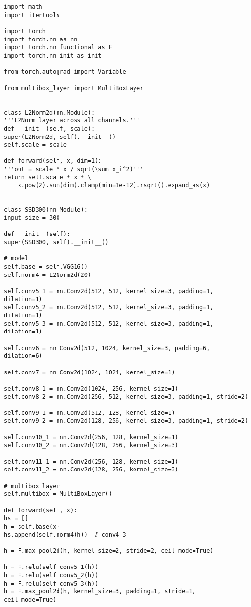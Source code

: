 \begin{lstlisting}[caption={SSD网络模型}]
import math
import itertools

import torch
import torch.nn as nn
import torch.nn.functional as F
import torch.nn.init as init

from torch.autograd import Variable

from multibox_layer import MultiBoxLayer


class L2Norm2d(nn.Module):
'''L2Norm layer across all channels.'''
def __init__(self, scale):
super(L2Norm2d, self).__init__()
self.scale = scale

def forward(self, x, dim=1):
'''out = scale * x / sqrt(\sum x_i^2)'''
return self.scale * x * \
	x.pow(2).sum(dim).clamp(min=1e-12).rsqrt().expand_as(x)


class SSD300(nn.Module):
input_size = 300

def __init__(self):
super(SSD300, self).__init__()

# model
self.base = self.VGG16()
self.norm4 = L2Norm2d(20)

self.conv5_1 = nn.Conv2d(512, 512, kernel_size=3, padding=1, dilation=1)
self.conv5_2 = nn.Conv2d(512, 512, kernel_size=3, padding=1, dilation=1)
self.conv5_3 = nn.Conv2d(512, 512, kernel_size=3, padding=1, dilation=1)

self.conv6 = nn.Conv2d(512, 1024, kernel_size=3, padding=6, dilation=6)

self.conv7 = nn.Conv2d(1024, 1024, kernel_size=1)

self.conv8_1 = nn.Conv2d(1024, 256, kernel_size=1)
self.conv8_2 = nn.Conv2d(256, 512, kernel_size=3, padding=1, stride=2)

self.conv9_1 = nn.Conv2d(512, 128, kernel_size=1)
self.conv9_2 = nn.Conv2d(128, 256, kernel_size=3, padding=1, stride=2)

self.conv10_1 = nn.Conv2d(256, 128, kernel_size=1)
self.conv10_2 = nn.Conv2d(128, 256, kernel_size=3)

self.conv11_1 = nn.Conv2d(256, 128, kernel_size=1)
self.conv11_2 = nn.Conv2d(128, 256, kernel_size=3)

# multibox layer
self.multibox = MultiBoxLayer()

def forward(self, x):
hs = []
h = self.base(x)
hs.append(self.norm4(h))  # conv4_3

h = F.max_pool2d(h, kernel_size=2, stride=2, ceil_mode=True)

h = F.relu(self.conv5_1(h))
h = F.relu(self.conv5_2(h))
h = F.relu(self.conv5_3(h))
h = F.max_pool2d(h, kernel_size=3, padding=1, stride=1, ceil_mode=True)


\end{lstlisting}
